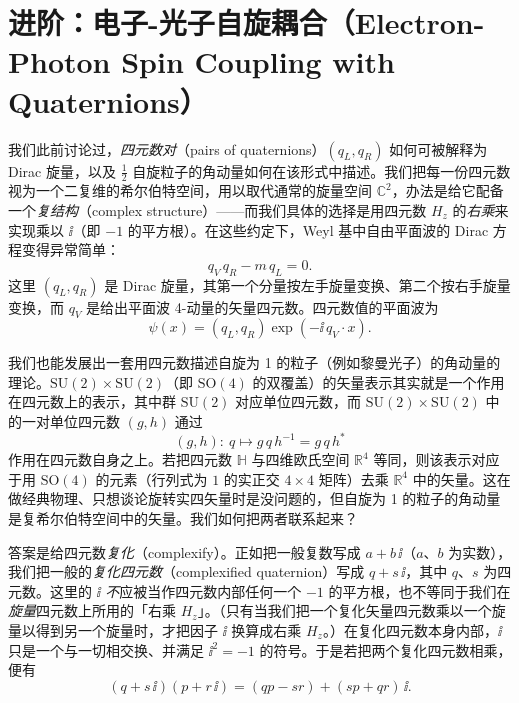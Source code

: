 \section{进阶：电子-光子自旋耦合（Electron-Photon Spin Coupling with Quaternions）}

我们此前讨论过，\emph{四元数对}（pairs of quaternions）$(q_L,q_R)$ 如何可被解释为 Dirac 旋量，以及 $\tfrac12$ 自旋粒子的角动量如何在该形式中描述。我们把每一份四元数视为一个二复维的希尔伯特空间，用以取代通常的旋量空间 $\mathbb{C}^{2}$，办法是给它配备一个\emph{复结构}（complex structure）——而我们具体的选择是用四元数 $H_z$ 的\emph{右乘}来实现乘以 $\ii$（即 $-1$ 的平方根）。在这些约定下，Weyl 基中自由平面波的 Dirac 方程变得异常简单：
\begin{equation*}
q_V\,q_R - m\,q_L = 0 .
\end{equation*}
这里 $(q_L,q_R)$ 是 Dirac 旋量，其第一个分量按左手旋量变换、第二个按右手旋量变换，而 $q_V$ 是给出平面波 4-动量的矢量四元数。四元数值的平面波为
\begin{equation*}
\psi(x)=(q_L,q_R)\exp(-\ii\,q_V\cdot x).
\end{equation*}

我们也能发展出一套用四元数描述自旋为 1 的粒子（例如黎曼光子）的角动量的理论。$\mathrm{SU}(2)\times\mathrm{SU}(2)$（即 $\mathrm{SO}(4)$ 的双覆盖）的矢量表示其实就是一个作用在四元数上的表示，其中群 $\mathrm{SU}(2)$ 对应单位四元数，而 $\mathrm{SU}(2)\times\mathrm{SU}(2)$ 中的一对单位四元数 $(g,h)$ 通过
\begin{equation*}
(g,h):\ q\mapsto g\,q\,h^{-1}=g\,q\,h^*
\end{equation*}
作用在四元数自身之上。若把四元数 $\mathbb{H}$ 与四维欧氏空间 $\mathbb{R}^{4}$ 等同，则该表示对应于用 $\mathrm{SO}(4)$ 的元素（行列式为 $1$ 的实正交 $4\times4$ 矩阵）去乘 $\mathbb{R}^{4}$ 中的矢量。这在做经典物理、只想谈论旋转实四矢量时是没问题的，但自旋为 1 的粒子的角动量是复希尔伯特空间中的矢量。我们如何把两者联系起来？

答案是给四元数\emph{复化}（complexify）。正如把一般复数写成 $a+b\,\ii$（$a$、$b$ 为实数），我们把一般的\emph{复化四元数}（complexified quaternion）写成 $q+s\,\ii$，其中 $q$、$s$ 为四元数。这里的 $\ii$ \emph{不}应被当作四元数内部任何一个 $-1$ 的平方根，也不等同于我们在\emph{旋量}四元数上所用的「右乘 $H_z$」。（只有当我们把一个复化矢量四元数乘以一个旋量以得到另一个旋量时，才把因子 $\ii$ 换算成右乘 $H_z$。）在复化四元数本身内部，$\ii$ 只是一个与一切相交换、并满足 $\ii^{2}=-1$ 的符号。于是若把两个复化四元数相乘，便有
\begin{equation*}
(q+s\,\ii)(p+r\,\ii)=(qp-sr)+(sp+qr)\,\ii .
\end{equation*}

